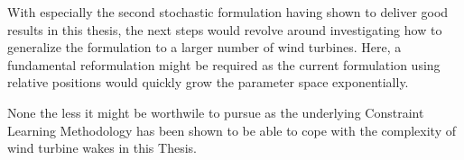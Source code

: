 With especially the second stochastic formulation having shown to deliver good results in this thesis, the next steps would revolve around investigating how to generalize the formulation to a larger number of wind turbines. Here, a fundamental reformulation might be required as the current formulation using relative positions would quickly grow the parameter space exponentially. 

None the less it might be worthwile to pursue as the underlying Constraint Learning Methodology has been shown to be able to cope with the complexity of wind turbine wakes in this Thesis.